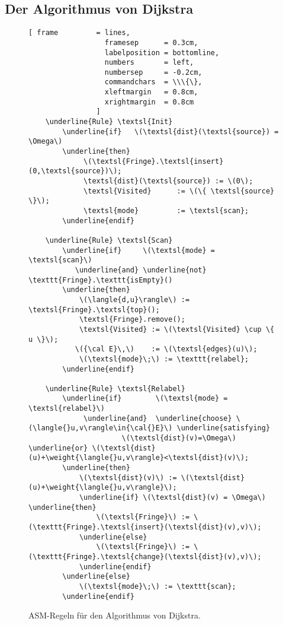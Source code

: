 \subsection{Der Algorithmus von Dijkstra}
\begin{figure}[!htt]
  \centering
\begin{Verbatim}[ frame         = lines, 
                  framesep      = 0.3cm, 
                  labelposition = bottomline,
                  numbers       = left,
                  numbersep     = -0.2cm,
                  commandchars  = \\\{\},
                  xleftmargin   = 0.8cm,
                  xrightmargin  = 0.8cm
                ]
    \underline{Rule} \textsl{Init}
        \underline{if}   \(\textsl{dist}(\textsl{source}) = \Omega\)
        \underline{then} 
             \(\textsl{Fringe}.\textsl{insert}(0,\textsl{source})\);
             \textsl{dist}(\textsl{source}) := \(0\);
             \textsl{Visited}      := \(\{ \textsl{source} \}\);
             \textsl{mode}         := \textsl{scan};
        \underline{endif}
        
    \underline{Rule} \textsl{Scan}
        \underline{if}     \(\textsl{mode} = \textsl{scan}\)
           \underline{and} \underline{not} \texttt{Fringe}.\texttt{isEmpty}()  
        \underline{then}
            \(\langle{d,u}\rangle\) := \textsl{Fringe}.\textsl{top}();
            \textsl{Fringe}.remove();
            \textsl{Visited} := \(\textsl{Visited} \cup \{ u \}\);
           \({\cal E}\,\)    := \(\textsl{edges}(u)\);            
            \(\textsl{mode}\;\) := \texttt{relabel};
        \underline{endif}

    \underline{Rule} \textsl{Relabel}
        \underline{if}        \(\textsl{mode} = \textsl{relabel}\)
             \underline{and}  \underline{choose} \(\langle{}u,v\rangle\in{\cal{}E}\) \underline{satisfying}  
                      \(\textsl{dist}(v)=\Omega\) \underline{or} \(\textsl{dist}(u)+\weight{\langle{}u,v\rangle}<\textsl{dist}(v)\);
        \underline{then}
            \(\textsl{dist}(v)\) := \(\textsl{dist}(u)+\weight{\langle{}u,v\rangle}\);
            \underline{if} \(\textsl{dist}(v) = \Omega\) \underline{then}
                \(\textsl{Fringe}\) := \(\texttt{Fringe}.\textsl{insert}(\textsl{dist}(v),v)\);
            \underline{else}
                \(\textsl{Fringe}\) := \(\texttt{Fringe}.\textsl{change}(\textsl{dist}(v),v)\);
            \underline{endif} 
        \underline{else} 
            \(\textsl{mode}\;\) := \texttt{scan};
        \underline{endif}
\end{Verbatim}
\vspace*{-0.3cm}
  \caption{ASM-Regeln f\"ur den Algorithmus von Dijkstra.}
  \label{fig:rules-dijkstra}
\end{figure} 

